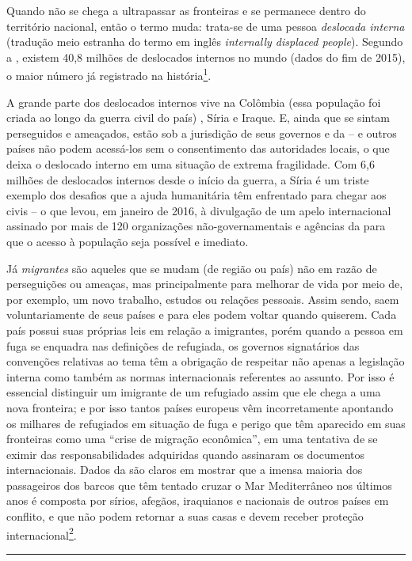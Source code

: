 Quando não se chega a ultrapassar as fronteiras e se permanece dentro do
território nacional, então o termo muda: trata-se de uma pessoa
\textit{deslocada interna} (tradução meio estranha do termo em inglês
\emph{internally displaced people}). Segundo a , existem 40,8 milhões
de deslocados internos no mundo (dados do fim de 2015), o maior número
já registrado na história\footnote{Ibid.}. 

A grande parte dos deslocados internos
vive na Colômbia (essa população foi criada ao longo da guerra civil do
país) , Síria e Iraque. E, ainda que se sintam perseguidos e ameaçados,
estão sob a jurisdição de seus governos e da  -- e outros países
não podem acessá-los sem o consentimento das autoridades locais, o que
deixa o deslocado interno em uma situação de extrema fragilidade. Com
6,6 milhões de deslocados internos desde o início da guerra, a Síria é
um triste exemplo dos desafios que a ajuda humanitária têm enfrentado
para chegar aos civis -- o que levou, em janeiro de 2016, à divulgação
de um apelo internacional assinado por mais de 120 organizações
não-governamentais e agências da  para que o acesso à população seja
possível e imediato.

Já \textit{migrantes} são aqueles que se mudam (de região ou país) não
em razão de perseguições ou ameaças, mas principalmente para melhorar de
vida por meio de, por exemplo, um novo trabalho, estudos ou relações
pessoais. Assim sendo, saem voluntariamente de seus países e para eles
podem voltar quando quiserem. Cada país possui suas próprias leis em
relação a imigrantes, porém quando a pessoa em fuga se enquadra nas
definições de refugiada, os governos signatários das convenções relativas
ao tema têm a obrigação de respeitar não apenas a legislação interna
como também as normas internacionais referentes ao assunto. Por isso é
essencial distinguir um imigrante de um refugiado assim que ele chega a
uma nova fronteira; e por isso tantos países europeus vêm incorretamente
apontando os milhares de refugiados em situação de fuga e perigo que têm
aparecido em suas fronteiras como uma ``crise de migração econômica'',
em uma tentativa de se eximir das responsabilidades adquiridas quando
assinaram os documentos internacionais. Dados da  são claros em
mostrar que a imensa maioria dos passageiros dos barcos que têm tentado
cruzar o Mar Mediterrâneo nos últimos anos é composta por sírios,
afegãos, iraquianos e nacionais de outros países em conflito, e que não
podem retornar a suas casas e devem receber proteção internacional\footnote{Refugees/Migrants Response -- 
Mediterranean: goo.gl/MQ6I6B}.




